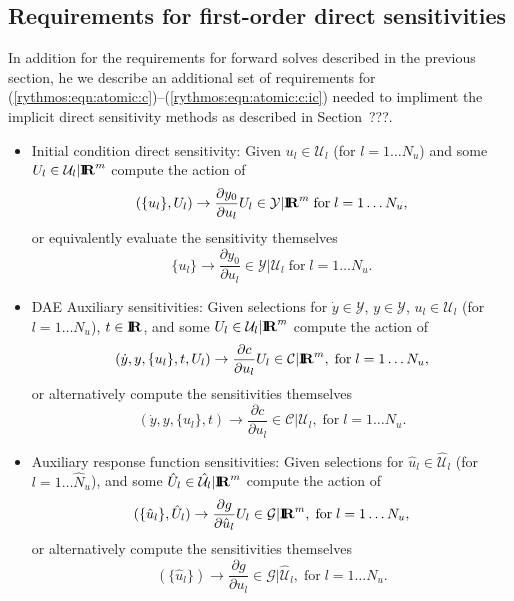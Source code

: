 \documentclass[pdf,ps2pdf,11pt]{SANDreport}
\begin{document}
\subsection{Requirements for first-order direct sensitivities}

In addition for the requirements for forward solves described in the previous
section, he we describe an additional set of requirements for
(\ref{rythmos:eqn:atomic:c})--(\ref{rythmos:eqn:atomic:c:ic}) needed to
impliment the implicit direct sensitivity methods as described in Section~???.

\begin{itemize}

{}\item Initial condition direct sensitivity: Given $u_l\in\mathcal{U}_l$ (for
$l=1\ldots{}N_u$) and some $U_l\in\mathcal{U}_l|\mbox{\textbf{I}}\hspace{-0.6ex}\mbox{\textbf{R}}^m$ compute the action of
\[
(\{u_l\},U_l) {}\rightarrow \frac{\partial y_0}{\partial u_l} U_l \in \mathcal{Y}|\mbox{\textbf{I}}\hspace{-0.6ex}\mbox{\textbf{R}}^m
\; \mbox{for} \; l = 1 {}\ldots N_u,
\]
or equivalently evaluate the sensitivity themselves
\[
\{u_l\} {}\rightarrow \frac{\partial y_0}{\partial u_l} \in \mathcal{Y}|\mathcal{U}_l
\; \mbox{for} \; l = 1 {}\ldots N_u.
\]

{}\item DAE Auxiliary sensitivities: Given selections for
$\dot{y}\in\mathcal{Y}$, $y\in\mathcal{Y}$, $u_l\in\mathcal{U}_l$ (for
$l=1\ldots{}N_u$), $t\in\mbox{\textbf{I}}\hspace{-0.6ex}\mbox{\textbf{R}}$, and some $U_l\in\mathcal{U}_l|\mbox{\textbf{I}}\hspace{-0.6ex}\mbox{\textbf{R}}^m$ compute
the action of
\[
(\dot{y},y,\{u_l\},t,U_l) {}\rightarrow \frac{\partial c}{\partial u_l} U_l \in \mathcal{C}|\mbox{\textbf{I}}\hspace{-0.6ex}\mbox{\textbf{R}}^m,
\; \mbox{for} \; l = 1 {}\ldots N_u,
\]
or alternatively compute the sensitivities themselves
\[
(\dot{y},y,\{u_l\},t) {}\rightarrow \frac{\partial c}{\partial u_l} \in \mathcal{C}|\mathcal{U}_l,
\; \mbox{for} \; l = 1 {}\ldots N_u.
\]

{}\item Auxiliary response function sensitivities: Given selections for
$\hat{u}_l\in\hat{\mathcal{U}}_l$ (for $l=1\ldots{}\hat{N}_u$), and some
$\hat{U}_l\in\hat{\mathcal{U}}_l|\mbox{\textbf{I}}\hspace{-0.6ex}\mbox{\textbf{R}}^m$ compute the action of
\[
(\{\hat{u}_l\},\hat{U}_l) {}\rightarrow \frac{\partial g}{\partial \hat{u}_l} U_l \in \mathcal{G}|\mbox{\textbf{I}}\hspace{-0.6ex}\mbox{\textbf{R}}^m,
\; \mbox{for} \; l = 1 {}\ldots N_u,
\]
or alternatively compute the sensitivities themselves
\[
(\{\hat{u}_l\}) {}\rightarrow \frac{\partial g}{\partial u_l} \in \mathcal{G}|\hat{\mathcal{U}}_l,
\; \mbox{for} \; l = 1 {}\ldots N_u.
\]

\end{itemize}
\end{document}
